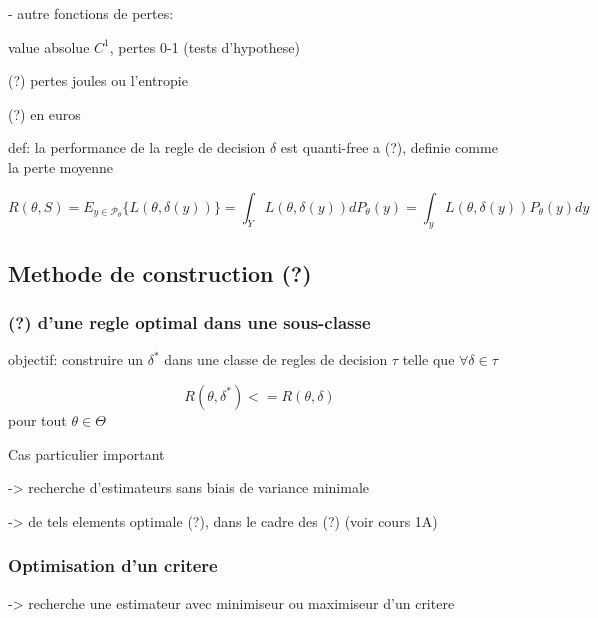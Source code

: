 \documentclass{article}
\begin{document}
- autre fonctions de pertes:

value absolue $C^1$, pertes 0-1 (tests d'hypothese)

(?) pertes joules ou l'entropie

(?) en euros

def: la performance de la regle de decision $\delta$ est quanti-free a (?), definie comme la perte moyenne

\begin{equation}
	R(\theta,S) = E_{y\in \mathscr{P}_\theta} \{L(\theta, \delta(y))\} = \int_Y L(\theta,\delta(y))d P_\theta(y)=\int_y L(\theta,\delta(y))P_\theta(y)dy
\end{equation}

\subsection{Methode de construction (?)}
\subsubsection{(?) d'une regle optimal dans une sous-classe}

objectif: construire un $\delta^*$ dans une classe de regles de decision $\tau$ telle que $\forall \delta \in \tau$

\begin{equation}
	R(\theta,\delta^*)<=R(\theta,\delta)
\end{equation}
pour tout $\theta\in\Theta$

Cas particulier important

-> recherche d'estimateurs sans biais de variance minimale

-> de tels elements optimale (?), dans le cadre des (?) (voir cours 1A)

\subsubsection{Optimisation d'un critere}

-> recherche une estimateur avec minimiseur ou maximiseur d'un critere
\end{document}
